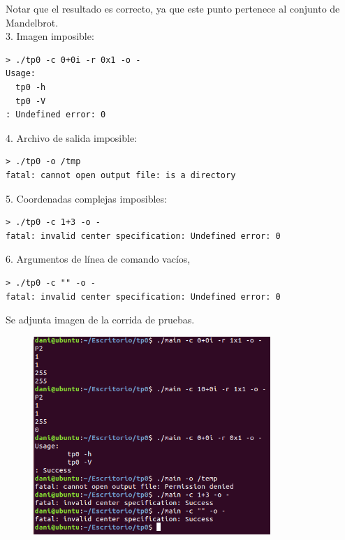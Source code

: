 \documentclass[a4paper,10pt]{article}
\begin{document}
Notar que el resultado es correcto, ya que este punto pertenece al conjunto de Mandelbrot.
\\
3. Imagen imposible:
\begin{verbatim}
> ./tp0 -c 0+0i -r 0x1 -o -
Usage:
  tp0 -h
  tp0 -V
: Undefined error: 0
\end{verbatim}


4. Archivo de salida imposible:
\begin{verbatim}
> ./tp0 -o /tmp
fatal: cannot open output file: is a directory
\end{verbatim}


5. Coordenadas complejas imposibles:
\begin{verbatim}
> ./tp0 -c 1+3 -o -
fatal: invalid center specification: Undefined error: 0
\end{verbatim}


6. Argumentos de l\'inea de comando vac\'ios,
\begin{verbatim}
> ./tp0 -c "" -o -
fatal: invalid center specification: Undefined error: 0
\end{verbatim}


Se adjunta imagen de la corrida de pruebas.
\begin{figure}
  \begin{center}
    \includegraphics[width=0.8\textwidth]{pruebas.png}
    \label{fig:Resultado de correr los casos de prueba antes mencionados}
    \caption{}
  \end{center}
\end{figure}
\end{document}
